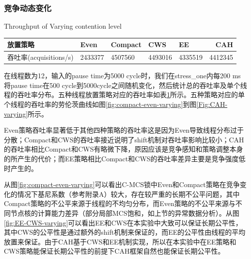 \subsubsection{竞争动态变化}
\begin{table}[!hpb]
  \centering
    {Throughput of Varying contention level}
  \label{tab:thrpt-varying}
  \begin{tabular}{@{}lllllr@{}} \toprule
    放置策略 & Even & Compact & CWS & EE & CAH\\ \midrule
    吞吐率(acquisitions/s)	&2433377	&4507560	& 4493016	& 4335519	& 4412345 \\
  \end{tabular}
\end{table}
在线程数为12，输入的pause time为5000 cycle时，我们在stress\_one内每200 ms 将pause time在500 cycle到5000cycle之间随机变化，然后统计总的吞吐率及单个线程的吞吐率分布。五种线程放置策略对应的吞吐率如表\ref{tab:thrpt-varying}所示。五种策略对应的单个线程的吞吐率的劳伦茨曲线如图\ref{fig:compact-even-varying}到图\ref{Fig:CAH-varying}所示。

Even策略吞吐率显著低于其他四种策略的吞吐率这是因为Even导致线程分布过于分散；Compact和CWS的吞吐率接近说明了shift机制对吞吐率影响比较小；CAH的吞吐率相比Compact和CWS有略微下降，原因应该是竞争感知和策略调整本身的所产生的代价；而EE策略相比Compact和CWS的吞吐率差异主要是竞争强度低时产生的。

从图\ref{fig:compact-even-varying}可以看出C-MCS锁中Even和Compact策略在竞争变化的情况下基尼系数（参考附录A）较大，存在较严重的长期不公平问题，其中Compact策略的不公平来源于线程的不均匀分布，而Even策略的不公平来源与不同节点核的计算能力差异（部分局部MCS饱和，如上节的异常数据分析）。从图\ref{fig:EE-CWS-varying}可以看出EE和CWS在本实验中大致可以保证长期公平性，其中CWS的公平性是通过额外的shift机制来保证的，而EE的公平性由线程的平均放置来保证。由于CAH基于CWS和EE机制实现，所以在本实验中在EE策略和CWS策略能保证长期公平性的前提下CAH框架自然也能保证长期公平性。

